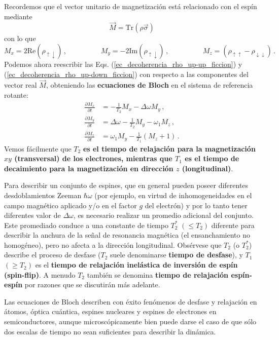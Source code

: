 \documentclass[a4paper,11pt]{book} %
\numberwithin{equation}{chapter}
\def\lp{\left(}
\def\rp{\right)}
\begin{document}
Recordemos que el vector unitario de magnetización está relacionado con el espín mediante
	\begin{equation}
	\vec{M} = \text{Tr} \lp \rho \vec{\sigma} \rp
	\end{equation}
con lo que
	\begin{equation}
	M_x = 2 \text{Re} (\rho_{\uparrow \downarrow})\, , \hspace{2cm}
	M_y = -2 \text{Im}(\rho_{\uparrow \downarrow}) \, , \hspace{2cm}	
	M_z = (\rho_{\uparrow \uparrow} - \rho_{\downarrow \downarrow}) \,.
	\end{equation}
Podemos ahora reescribir las Eqs. (\ref{ec_decoherencia_rho_up-up_ficcion}) y (\ref{ec_decoherencia_rho_up-down_ficcion}) con respecto a las componentes del vector real $\vec{M}$, obteniendo las \textbf{ecuaciones de Bloch} en el sistema de referencia rotante:
	\begin{align}
	\frac{\partial M_x}{\partial t} & = - \frac{1}{T_2} M_x - \Delta\omega M_y \, , \\
	\frac{\partial M_y}{\partial t} & = \Delta\omega - \frac{1}{T_2} M_y - \omega_1 M_z\, , \\
	\frac{\partial M_z}{\partial t} & = \omega_1 M_y - \frac{1}{T_1} (M_z +1) \, .
	\end{align}
Vemos fácilmente que $T_2$ \textbf{es el tiempo de relajación para la magnetización $xy$ (transversal) de los electrones, mientras que $T_1$ es el tiempo de decaimiento para la magnetización en dirección $z$ (longitudinal)}. 

Para describir un conjunto de espines, que en general pueden poseer diferentes desdoblamientos Zeeman $\hbar \omega$ (por ejemplo, en virtud de inhomogeneidades en el campo magnético aplicado y/o en el factor $g$ del electrón) y por lo tanto tener diferentes valor de $\Delta\omega$, es necesario realizar un promedio adicional del conjunto. Este promediado conduce a una constante de tiempo $T^{*}_2$ $(\leq T_2)$ diferente para describir la anchura de la señal de resonancia magnética (el ensanchamiento no homogéneo), pero no afecta a la dirección longitudinal. Obsérvese que $T_2$ (o $T^{*}_2$) describe el proceso de desfase ($T_2$ suele denominarse \textbf{tiempo de desfase}), y $T_1$ $(\geq  T_2)$ es el \textbf{tiempo de relajación inelástica de inversión de espín (spin-flip)}. A menudo $T_2$ también se denomina \textbf{tiempo de relajación espín-espín} por razones que se discutirán más adelante. 

Las ecuaciones de Bloch describen con éxito fenómenos de desfase y relajación en átomos, óptica cuántica, espines nucleares y espines de electrones en semiconductores, aunque microscópicamente bien puede darse el caso de que sólo dos escalas de tiempo no sean suficientes para describir la dinámica. 
\end{document}
